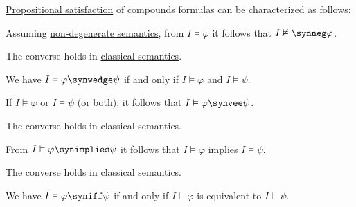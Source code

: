 \begin{proposition}\label{thm:propositional_satisfaction_characterization}
  \hyperref[def:propositional_semantics/satisfaction]{Propositional satisfaction} of compounds formulas can be characterized as follows:
  \begin{thmenum}
     Assuming \hyperref[def:truth_value_algebra/degenerate]{non-degenerate semantics}, from \( I \vDash \varphi \) it follows that \( I \nvDash \synneg \varphi \).

    The converse holds in \hyperref[def:truth_value_algebra/classical]{classical semantics}.

     We have \( I \vDash \varphi \synwedge \psi \) if and only if \( I \vDash \varphi \) and \( I \vDash \psi \).

     If \( I \vDash \varphi \) or \( I \vDash \psi \) (or both), it follows that \( I \vDash \varphi \synvee \psi \).

    The converse holds in classical semantics.

     From \( I \vDash \varphi \synimplies \psi \) it follows that \( I \vDash \varphi \) implies \( I \vDash \psi \).

    The converse holds in classical semantics.

     We have \( I \vDash \varphi \syniff \psi \) if and only if \( I \vDash \varphi \) is equivalent to \( I \vDash \psi \).
  \end{thmenum}
\end{proposition}
